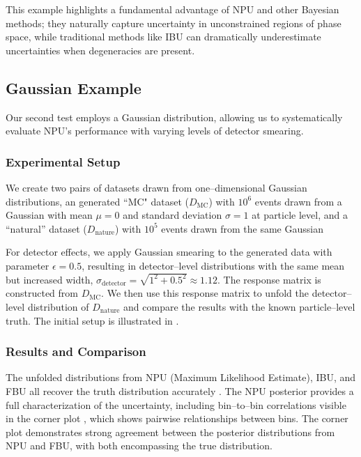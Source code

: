         This example highlights a fundamental advantage of NPU and other Bayesian methods;
        they naturally capture uncertainty in unconstrained regions of phase space, while traditional methods like IBU can dramatically underestimate uncertainties when degeneracies are present.
\subsection{Gaussian Example}
    Our second test employs a Gaussian distribution, allowing us to systematically evaluate NPU's performance with varying levels of detector smearing. 
    \subsubsection{Experimental Setup}
        We create two pairs of datasets drawn from one--dimensional Gaussian distributions,
        an generated ``MC" dataset ($D_\text{MC}$) with $10^6$ events drawn from a Gaussian with mean $\mu = 0$ and standard deviation $\sigma = 1$ at particle level, and a ``natural'' dataset ($D_\text{nature}$) with $10^5$ events drawn from the same Gaussian
    
        For detector effects, we apply Gaussian smearing to the generated data with parameter $\epsilon = 0.5$, resulting in detector--level distributions with the same mean but increased width, $\sigma_\text{detector} = \sqrt{1^2 + 0.5^2} \approx 1.12$.
        The response matrix is constructed from $D_\text{MC}$.
        We then use this response matrix to unfold the detector--level distribution of $D_\text{nature}$ and compare the results with the known particle--level truth.
        The initial setup is illustrated in .
    \subsubsection{Results and Comparison}
        The unfolded distributions from NPU (Maximum Likelihood Estimate), IBU, and FBU all recover the truth distribution accurately .
        The NPU posterior provides a full characterization of the uncertainty, including bin--to--bin correlations visible in the corner plot , which shows pairwise relationships between bins.
        The corner plot demonstrates strong agreement between the posterior distributions from NPU and FBU, with both encompassing the true distribution.

